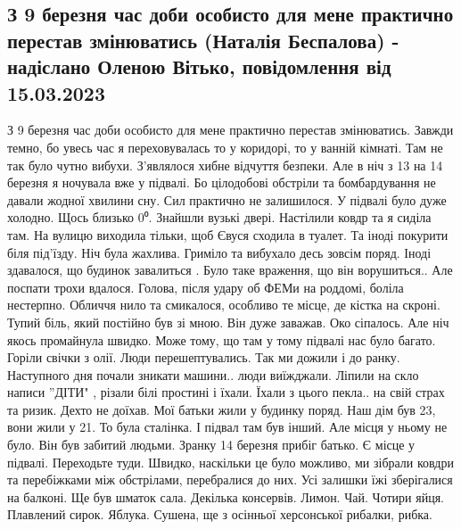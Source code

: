  
 
 
 
 

\subsection{З 9 березня час доби особисто для мене практично  перестав змінюватись (Наталія Беспалова) 
- надіслано Оленою Вітько, повідомлення від 15.03.2023}
\label{sec:mariupol.diaries.bespalova_natalia}

З 9 березня час доби особисто для мене практично  перестав змінюватись. Завжди
темно, бо  увесь час я переховувалась то у коридорі, то у ванній кімнаті.  Там
не так було чутно вибухи. З'являлося хибне відчуття безпеки.  Але в ніч з 13 на
14 березня я ночувала вже у підвалі.  Бо цілодобові обстріли та бомбардування
не давали  жодної хвилини сну. Сил практично не залишилося. У підвалі було дуже
холодно. Щось близько  0⁰. Знайшли вузькі двері. Настілили ковдр та я  сиділа
там. На вулицю виходила тільки, щоб Євуся сходила в туалет. Та іноді покурити
біля під'їзду. Ніч була жахлива. Гриміло та вибухало десь зовсім поряд. Іноді
здавалося, що будинок завалиться . Було таке  враження, що він ворушиться.. Але
поспати трохи вдалося. Голова,  після удару об ФЕМи  на роддомі,  боліла
нестерпно. Обличчя нило та смикалося, особливо те місце, де кістка на скроні.
Тупий біль, який постійно  був зі мною. Він дуже заважав. Око сіпалось. Але
ніч якось промайнула швидко.  Може тому, що там у тому підвалі нас було багато.
Горіли свічки з олії. Люди перешептувались. Так ми дожили  і до ранку.
Наступного дня  почали зникати машини.. люди виїжджали.  Ліпили на скло написи
''ДІТИ" , різали білі простині і їхали. Їхали з цього пекла.. на  свій страх та
ризик. Дехто не доїхав. Мої  батьки жили у будинку поряд. Наш дім був 23, вони
жили у 21. То була сталінка. І підвал там був інший. Але місця у ньому не було.
Він був забитий людьми. Зранку 14 березня прибіг батько.  Є місце у підвалі.
Переходьте туди. Швидко, наскільки це було можливо,  ми зібрали ковдри та
перебіжками між  обстрілами, перебралися до них. Усі залишки їжі зберігалися на
балконі.  Ще був шматок сала.   Декілька консервів. Лимон. Чай. Чотири яйця.
Плавлений сирок. Яблука.  Сушена, ще з осінньої херсонської рибалки, рибка.
